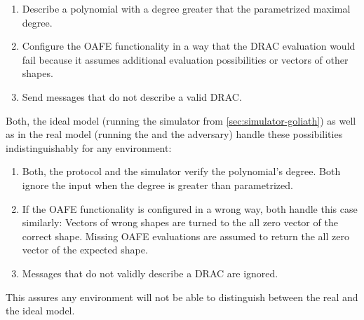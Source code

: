 \begin{enumerate}

  \item Describe a polynomial with a degree greater that the parametrized
    maximal degree.

  \item Configure the OAFE functionality in a way that the DRAC evaluation would
    fail because it assumes additional evaluation possibilities or vectors of
    other shapes.

  \item Send messages that do not describe a valid DRAC.

\end{enumerate}

Both, the ideal model (running the simulator from \ref{sec:simulator-goliath})
as well as in the real model (running the \JWprotoSymOPE{} and the adversary)
handle these possibilities indistinguishably for any environment:

\begin{enumerate}

  \item Both, the protocol and the simulator verify the polynomial's degree.
    Both ignore the input when the degree is greater than parametrized.

  \item If the OAFE functionality is configured in a wrong way, both handle this
    case similarly: Vectors of wrong shapes are turned to the all zero vector of
    the correct shape. Missing OAFE evaluations are assumed to return the all
    zero vector of the expected shape.

  \item Messages that do not validly describe a DRAC are ignored.

\end{enumerate}

This assures any environment will not be able to distinguish between the real
and the ideal model.

